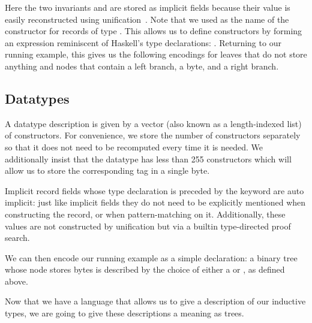 Here the two invariants  and
 are stored as implicit fields
because their value is easily reconstructed using
unification~\citep{DBLP:conf/tlca/AbelP11}.
%
Note that we used \IdrisData{(::)} as the name of the
constructor for records of type .
This allows us to define constructors by forming an
expression reminiscent of Haskell's type declarations:
 \IdrisData{::} .
%
Returning to our running example, this gives us the following encodings for
leaves that do not store anything
and nodes that contain a left branch, a byte, and a right branch.

\noindent
\begin{minipage}[t]{.38\textwidth}
\end{minipage}\hfill
\begin{minipage}[t]{.58\textwidth}
\end{minipage}

\subsection{Datatypes}

A datatype description is given by a vector (also known as
a length-indexed list) of constructors.
%
For convenience, we store the number of constructors separately so
that it does not need to be recomputed every time it is needed.
%
We additionally insist that the datatype has less than 255
constructors which will allow us to store the corresponding
tag in a single byte.


\begin{remark}
  Implicit record fields whose type declaration is preceded by the
   keyword are auto implicit: just like implicit
  fields they do not need to be explicitly mentioned when constructing
  the record, or when pattern-matching on it.
  Additionally, these values are not constructed by unification but
  via a builtin type-directed proof search.
\end{remark}

We can then encode our running example as a simple 
declaration: a binary tree whose node stores bytes is described by the choice
of either a  or , as defined above.


Now that we have a language that allows us to give a description of our
inductive types, we are going to give these descriptions a meaning as trees.
